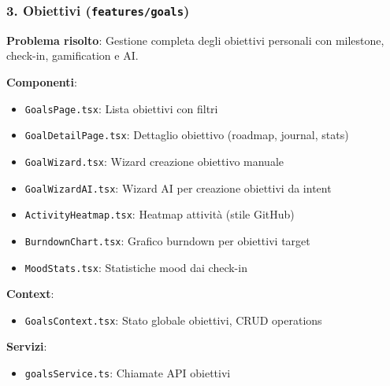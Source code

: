 \documentclass[11pt,a4paper]{article}
\begin{document}
\subsubsection{3. Obiettivi (\texttt{features/goals})}

\textbf{Problema risolto}: Gestione completa degli obiettivi personali con milestone, check-in, gamification e AI.

\textbf{Componenti}:
\begin{itemize}
    \item \texttt{GoalsPage.tsx}: Lista obiettivi con filtri
    \item \texttt{GoalDetailPage.tsx}: Dettaglio obiettivo (roadmap, journal, stats)
    \item \texttt{GoalWizard.tsx}: Wizard creazione obiettivo manuale
    \item \texttt{GoalWizardAI.tsx}: Wizard AI per creazione obiettivi da intent
    \item \texttt{ActivityHeatmap.tsx}: Heatmap attività (stile GitHub)
    \item \texttt{BurndownChart.tsx}: Grafico burndown per obiettivi target
    \item \texttt{MoodStats.tsx}: Statistiche mood dai check-in
\end{itemize}

\textbf{Context}:
\begin{itemize}
    \item \texttt{GoalsContext.tsx}: Stato globale obiettivi, CRUD operations
\end{itemize}

\textbf{Servizi}:
\begin{itemize}
    \item \texttt{goalsService.ts}: Chiamate API obiettivi
\end{itemize}
\end{document}
